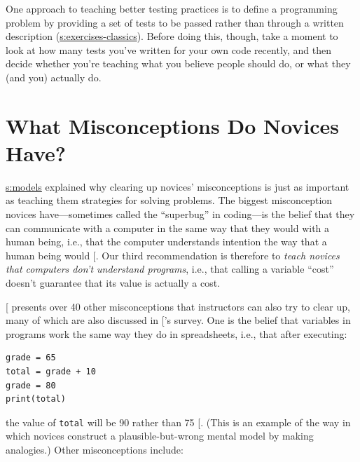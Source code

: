 One approach to teaching better testing practices is to define a
programming problem by providing a set of tests to be passed rather than
through a written description (\protect\hyperlink{SECTION}{s:exercises-classics}).
Before doing this, though, take a moment to look at how many tests
you've written for your own code recently, and then decide whether
you're teaching what you believe people should do, or what they (and
you) actually do.

\section{What Misconceptions Do Novices Have?}\label{s:pck-misunderstand}

\protect\hyperlink{CHAPTER}{s:models} explained why clearing up novices' misconceptions
is just as important as teaching them strategies for solving problems.
The biggest misconception novices have---sometimes called the ``superbug''
in coding---is the belief that they can communicate with a computer in the
same way that they would with a human being, i.e., that the computer
understands intention the way that a human being would
{[}\protect[\hyperlink{b:Pea1986}{Pea1986}]{]}. Our third recommendation is therefore to \emph{teach
novices that computers don't understand programs}, i.e., that calling a
variable ``cost'' doesn't guarantee that its value is actually a cost.

{[}\protect[\hyperlink{b:Sorv2018}{Sorv2018}]{]} presents over 40 other misconceptions that
instructors can also try to clear up, many of which are also discussed
in {[}\protect[\hyperlink{b:Qian2017}{Qian2017}]{]}'s survey. One is the belief that variables in
programs work the same way they do in spreadsheets, i.e., that after
executing:

\begin{lstlisting}
grade = 65
total = grade + 10
grade = 80
print(total)
\end{lstlisting}

the value of \texttt{total} will be 90 rather than 75 {[}\protect[\hyperlink{b:Kohn2017}{Kohn2017}]{]}.
(This is an example of the way in which novices construct a
plausible-but-wrong mental model by making analogies.) Other
misconceptions include:

